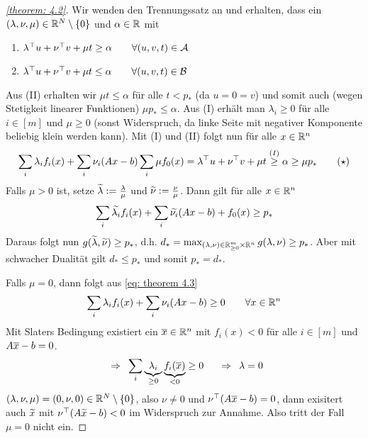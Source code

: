 \begin{proof}[\cref{theorem: 4.2}]
	Wir wenden den Trennungssatz an und erhalten, dass ein $(\lambda, \nu, \mu) \in \mathbb{R}^N \setminus \left\{ 0 \right\}$ und $\alpha \in \mathbb{R}$ mit 
	\begin{enumerate}[label=\Roman*., nolistsep]
		\item $\lambda^{\top} u + \nu^{\top} v + \mu  t \ge \alpha \qquad \forall (u,v,t) \in \mathcal{A}$
		\item $\lambda^{\top} u + \nu^{\top} v + \mu  t \le \alpha \qquad \forall (u,v,t) \in \mathcal{B}$
	\end{enumerate}
	Aus (II) erhalten wir $\mu t \le \alpha$ für alle $t < p_\ast$ (da $u = 0 = v$) und somit auch (wegen Stetigkeit linearer Funktionen) $\mu p_\ast \le  \alpha$. Aus (I) erhält man $\lambda_i \ge 0$ für alle $i \in [m]$ und $\mu \ge 0$ (sonst Widerspruch, da linke Seite mit negativer Komponente beliebig klein werden kann). Mit (I) und (II) folgt nun für alle $x \in \mathbb{R}^n$	\begin{equation*}
		\sum_i \lambda_i f_i(x) + \sum_i \nu_i (Ax - b) \sum_i \mu f_0(x) 
		=
		\lambda^{\top} u + \nu^{\top} v + \mu t \overset{(I)}{\ge} \alpha \ge \mu p_\ast 
		\tag{$\star$} \label{eq: theorem 4.3}
	\end{equation*}
	Falls $\mu > 0$ ist, setze $\widetilde{\lambda} \mathrel{:=} \frac{\lambda}{\mu}$ und $\widetilde{\nu} \mathrel{:=} \frac{\nu}{\mu}$. Dann gilt für alle $x \in \mathbb{R}^n$
	\begin{equation*}
		\sum_i \widetilde{\lambda_i} f_i(x) + \sum_i \widetilde{\nu_i} (Ax - b) + f_0(x) \ge p_\ast
	\end{equation*}
	Daraus folgt nun $g(\widetilde{\lambda}, \widetilde{\nu}) \ge p_\ast$, d.h. $d_\ast = \max_{(\lambda,\nu) \in \mathbb{R}^m_{\ge 0} \times \mathbb{R}^n} g(\lambda, \nu) \ge p_\ast$. Aber mit schwacher Dualität gilt $d_\ast \le p_\ast$ und somit $p_\ast = d_\ast$.
	
	Falls $\mu = 0$, dann folgt aus \eqref{eq: theorem 4.3} 
	\begin{equation*}
		\sum_i \lambda_i f_i(x) + \sum_i \nu_i (Ax - b) \ge 0 \qquad \forall x \in \mathbb{R}^n
	\end{equation*}
	Mit Slaters Bedingung existiert ein $\overline{x} \in \mathbb{R}^n$ mit $f_i(x) < 0$ für alle $i \in [m]$ und $A \overline{x} - b = 0$.
	\begin{equation*}
		\enskip \Rightarrow \enskip \sum_i \underbrace{\lambda_i}_{\ge 0} \underbrace{f_i(\overline{x})}_{< 0} \ge 0 \quad \enskip \Rightarrow \enskip \lambda = 0
	\end{equation*}
	$(\lambda, \nu, \mu) = (0,\nu,0) \in \mathbb{R}^N \setminus \left\{ 0 \right\}$, also $\nu \neq 0$ und $\nu^{\top} (A \overline{x} - b) = 0$, dann exisitert auch $\widetilde{x}$ mit $\nu^{\top} (A \widetilde{x} - b) < 0$ im Widerspruch zur Annahme. Also tritt der Fall $\mu = 0$ nicht ein.
\end{proof}